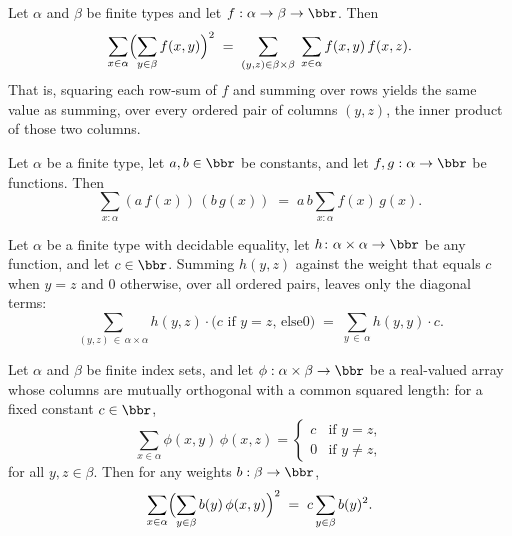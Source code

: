 \begin{lemma}
\label{CommunicationComplexity.Functions.InnerProduct.sum_sq_eq_sum_prod}
\leanok
{}
Let $\alpha$ and $\beta$ be finite types and let $f : \alpha \to \beta \to \bbr$. Then
\[
  \sum_{x \in \alpha} \Bigl(\sum_{y \in \beta} f(x,y)\Bigr)^2
  \;=\;
  \sum_{(y,z) \in \beta \times \beta} \; \sum_{x \in \alpha} f(x,y)\, f(x,z).
\]
That is, squaring each row-sum of $f$ and summing over rows yields the same value as
summing, over every ordered pair of columns $(y,z)$, the inner product of those two
columns.
\end{lemma}

\begin{lemma}
\label{CommunicationComplexity.Functions.InnerProduct.sum_mul_mul}
\leanok
{}
Let $\alpha$ be a finite type, let $a, b \in \bbr$ be constants, and let $f, g : \alpha
\to \bbr$ be functions. Then
\[
  \sum_{x : \alpha} (a\, f(x))\,(b\, g(x))
  \;=\; a\, b \sum_{x : \alpha} f(x)\, g(x).
\]
\end{lemma}

\begin{lemma}
\label{CommunicationComplexity.Functions.InnerProduct.sum_mul_ite_eq_diag}
\leanok
{}
Let $\alpha$ be a finite type with decidable equality, let $h \colon \alpha \times
\alpha \to \bbr$ be any function, and let $c \in \bbr$. Summing $h(y,z)$ against the
weight that equals $c$ when $y = z$ and $0$ otherwise, over all ordered pairs, leaves
only the diagonal terms:
\[
\sum_{(y,z)\,\in\,\alpha \times \alpha} h(y,z)\cdot\bigl(\text{$c$ if $y = z$, else
$0$}\bigr)
    \;=\; \sum_{y\,\in\,\alpha} h(y,y)\cdot c.
\]
\end{lemma}

\begin{lemma}
\label{CommunicationComplexity.Functions.InnerProduct.sum_sq_mul_of_orthogonal}
\leanok
{}
Let $\alpha$ and $\beta$ be finite index sets, and let $\phi : \alpha \times \beta \to
\bbr$ be a real-valued array whose columns are mutually orthogonal with a common squared
length: for a fixed constant $c \in \bbr$,
\[
\sum_{x \in \alpha} \phi(x,y)\,\phi(x,z) = \begin{cases} c & \text{if } y = z,\\ 0 &
\text{if } y \neq z,\end{cases}
\]
for all $y, z \in \beta$. Then for any weights $b : \beta \to \bbr$,
\[
  \sum_{x \in \alpha} \Bigl(\sum_{y \in \beta} b(y)\,\phi(x,y)\Bigr)^{2}
  \;=\; c \sum_{y \in \beta} b(y)^{2}.
\]
\end{lemma}

